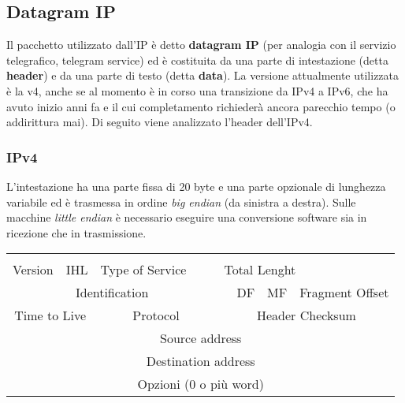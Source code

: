         \subsection{Datagram IP}
        Il pacchetto utilizzato dall’IP è detto \textbf{datagram IP} (per analogia con il servizio telegrafico,
        telegram service) ed è costituita da una parte di intestazione (detta \textbf{header}) e da una parte di
        testo (detta \textbf{data}). La versione attualmente utilizzata è la v4, anche se al momento è in corso
        una transizione da IPv4 a IPv6, che ha avuto inizio anni fa e il cui completamento richiederà
        ancora parecchio tempo (o addirittura mai). Di seguito viene analizzato l’header dell’IPv4.
    
            \subsubsection{IPv4}
            L’intestazione ha una parte fissa di 20 byte e una parte opzionale di lunghezza variabile ed è
            trasmessa in ordine \textit{big endian} (da sinistra a destra). Sulle macchine \textit{little endian} è necessario
            eseguire una conversione software sia in ricezione che in trasmissione.\\
           
            
            \begin{tabular}{|l|l|l|l|l|l|l|l|l|l|l|l|l|l|l|l|l|l|l|l|l|l|l|l|l|l|l|l|l|l|l|l|}
                \hline
                & & & & & & & & & & & & & & & & & & & & & & & & & & & & & & & \\
                \hline
                \multicolumn{32}{l}{} \\
                \hline
                \multicolumn{4}{|c|}{Version} & \multicolumn{4}{|c|}{IHL} & \multicolumn{6}{|c|}{Type of Service} & & & \multicolumn{16}{|l|}{Total Lenght}\\
                \hline
                \multicolumn{16}{|c|}{Identification} & & DF & MF & \multicolumn{13}{|c|}{Fragment Offset} \\
                \hline
                \multicolumn{8}{|c|}{Time to Live} & \multicolumn{8}{|c|}{Protocol} & \multicolumn{16}{|c|}{Header Checksum}\\
                \hline
                \multicolumn{32}{|c|}{Source address}\\
                \hline
                \multicolumn{32}{|c|}{Destination address}\\
                \hline
                \multicolumn{32}{|c|}{Opzioni (0 o più word)}\\
                \hline
            \end{tabular}

